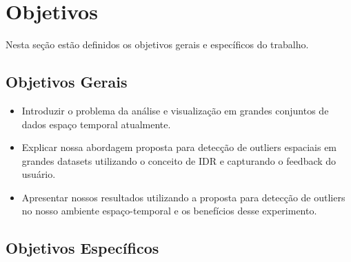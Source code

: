 \section{Objetivos}


Nesta seção estão definidos os objetivos gerais e específicos do trabalho.

\subsection{Objetivos Gerais}

\begin{itemize}
	\item
	      Introduzir o problema da análise e visualização em grandes conjuntos de dados espaço temporal atualmente.
	\item
	      Explicar nossa abordagem proposta para detecção de outliers espaciais em grandes datasets utilizando o conceito de IDR e capturando o feedback do usuário.
	\item
	      Apresentar nossos resultados utilizando a proposta para detecção de outliers no nosso ambiente espaço-temporal e os benefícios desse experimento.

\end{itemize}

\subsection{Objetivos Específicos}

